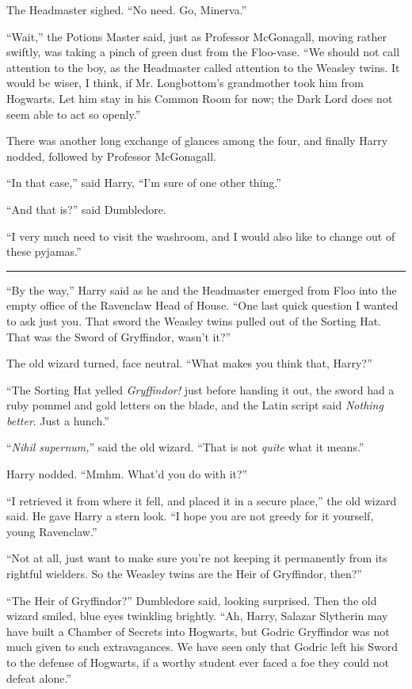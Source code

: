 The Headmaster sighed. ``No need. Go, Minerva.''

``Wait,'' the Potions Master said, just as Professor McGonagall, moving rather swiftly, was taking a pinch of green dust from the Floo-vase. ``We should not call attention to the boy, as the Headmaster called attention to the Weasley twins. It would be wiser, I think, if Mr. Longbottom's grandmother took him from Hogwarts. Let him stay in his Common Room for now; the Dark Lord does not seem able to act so openly.''

There was another long exchange of glances among the four, and finally Harry nodded, followed by Professor McGonagall.

``In that case,'' said Harry, ``I'm sure of one other thing.''

``And that is?'' said Dumbledore.

``I very much need to visit the washroom, and I would also like to change out of these pyjamas.''

\begin{center}\rule{3in}{0.4pt}\end{center}

``By the way,'' Harry said as he and the Headmaster emerged from Floo into the empty office of the Ravenclaw Head of House. ``One last quick question I wanted to ask just you. That sword the Weasley twins pulled out of the Sorting Hat. That was the Sword of Gryffindor, wasn't it?''

The old wizard turned, face neutral. ``What makes you think that, Harry?''

``The Sorting Hat yelled \emph{Gryffindor!} just before handing it out, the sword had a ruby pommel and gold letters on the blade, and the Latin script said \emph{Nothing better}. Just a hunch.''

``\emph{Nihil supernum,}'' said the old wizard. ``That is not \emph{quite} what it means.''

Harry nodded. ``Mmhm. What'd you do with it?''

``I retrieved it from where it fell, and placed it in a secure place,'' the old wizard said. He gave Harry a stern look. ``I hope you are not greedy for it yourself, young Ravenclaw.''

``Not at all, just want to make sure you're not keeping it permanently from its rightful wielders. So the Weasley twins are the Heir of Gryffindor, then?''

``The Heir of Gryffindor?'' Dumbledore said, looking surprised. Then the old wizard smiled, blue eyes twinkling brightly. ``Ah, Harry, Salazar Slytherin may have built a Chamber of Secrets into Hogwarts, but Godric Gryffindor was not much given to such extravagances. We have seen only that Godric left his Sword to the defense of Hogwarts, if a worthy student ever faced a foe they could not defeat alone.''

